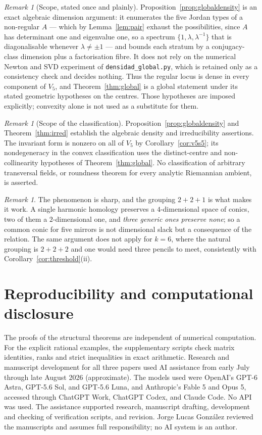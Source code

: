 \documentclass[11pt,a4paper]{article}
\theoremstyle{plain}
\theoremstyle{definition}
\theoremstyle{remark}
\newtheorem{remark}[theorem]{Remark}
\begin{document}
\begin{remark}[Scope, stated once and plainly]\label{rem:scope}
Proposition~\ref{prop:globaldensity} is an exact algebraic dimension argument: it
enumerates the five Jordan types of a non-regular $A$ --- which by
Lemma~\ref{lem:pair} exhaust the possibilities, since $A$ has determinant one and
eigenvalue one, so a spectrum $\{1,\lambda,\lambda^{-1}\}$ that is diagonalisable
whenever $\lambda\neq\pm1$ --- and bounds each stratum by a conjugacy-class
dimension plus a factorisation fibre. It does not rely on the numerical Newton and
SVD experiment of \texttt{densidad\_global.py}, which is retained only as a consistency
check and decides nothing. Thus the regular locus is dense in every component of
$V_5$, and Theorem~\ref{thm:global} is a global statement under its stated
geometric hypotheses on the centres. Those hypotheses are imposed explicitly;
convexity alone is not used as a substitute for them.
\end{remark}

\begin{remark}[Scope of the classification]\label{rem:gaps}
Proposition~\ref{prop:globaldensity} and Theorem~\ref{thm:irred} establish the
algebraic density and irreducibility assertions. The invariant form is nonzero
on all of $V_5$ by Corollary~\ref{cor:v5s5}; its nondegeneracy in the convex
classification uses the distinct-centre and non-collinearity hypotheses of
Theorem~\ref{thm:global}. No classification of arbitrary transversal fields,
or roundness theorem for every analytic Riemannian ambient, is asserted.
\end{remark}

\begin{remark}
The phenomenon is sharp, and the grouping $2+2+1$ is what makes it work. A single
harmonic homology preserves a $4$-dimensional space of conics, two of them a
$2$-dimensional one, and \emph{three generic ones preserve none}; so a common conic
for five mirrors is not dimensional slack but a consequence of the relation. The
same argument does not apply for $k=6$, where the natural grouping is $2+2+2$ and
one would need three pencils to meet, consistently with
Corollary~\ref{cor:threshold}(ii).
\end{remark}
\section*{Reproducibility and computational disclosure}
The proofs of the structural theorems are independent of numerical computation.
For the explicit rational examples, the supplementary scripts check matrix
identities, ranks and strict inequalities in exact arithmetic. Research and manuscript development for all three papers used AI assistance from early
July through late August 2026 (approximate). The models used were OpenAI's GPT-6 Astra,
GPT-5.6 Sol, and GPT-5.6 Luna, and Anthropic's Fable 5 and Opus 5, accessed through
ChatGPT Work, ChatGPT Codex, and Claude Code. No API was used. The assistance supported
research, manuscript drafting, development and checking of verification scripts, and revision.
Jorge Lucas Gonz\'alez reviewed the manuscripts and assumes full responsibility; no AI
system is an author.
\end{document}
